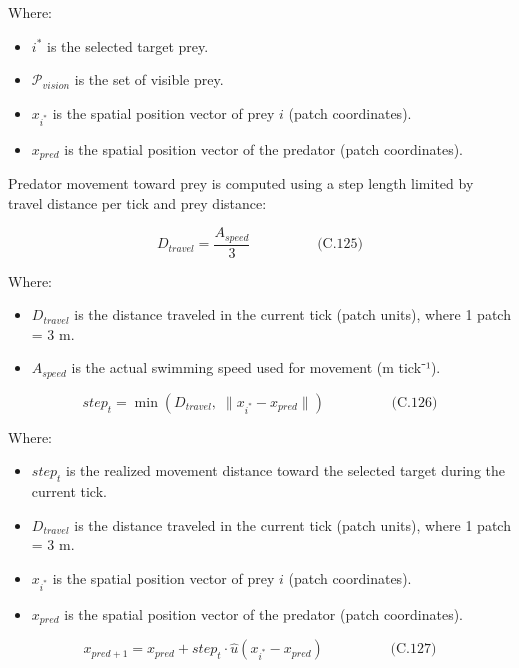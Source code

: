 \documentclass[
]{book}
\providecommand{\tightlist}{%
  \setlength{\itemsep}{0pt}\setlength{\parskip}{0pt}}
\begin{document}
Where:

\begin{itemize}
\tightlist
\item
  \(i^*\) is the selected target prey.
\item
  \(\mathcal{P}_{vision}\) is the set of visible prey.
\item
  \(x_{i^*}\) is the spatial position vector of prey \(i\) (patch
  coordinates).
\item
  \(x_{pred}\) is the spatial position vector of the predator (patch
  coordinates).
\end{itemize}

Predator movement toward prey is computed using a step length limited by
travel distance per tick and prey distance:

\[
\begin{equation} D_{travel} = \frac{A_{speed}}{3}  \hspace{2cm} \text{(C.125)} \end{equation}
\]

Where:

\begin{itemize}
\tightlist
\item
  \(D_{travel}\) is the distance traveled in the current tick (patch
  units), where 1 patch = 3 m.
\item
  \(A_{speed}\) is the actual swimming speed used for movement (m
  tick⁻¹).
\end{itemize}

\[
\begin{equation} step_t = \min(D_{travel},\; \|x_{i^*} - x_{pred}\|)  \hspace{2cm} \text{(C.126)} \end{equation}
\]

Where:

\begin{itemize}
\tightlist
\item
  \(step_{t}\) is the realized movement distance toward the selected
  target during the current tick.
\item
  \(D_{travel}\) is the distance traveled in the current tick (patch
  units), where 1 patch = 3 m.
\item
  \(x_{i^*}\) is the spatial position vector of prey \(i\) (patch
  coordinates).
\item
  \(x_{pred}\) is the spatial position vector of the predator (patch
  coordinates).
\end{itemize}

\[
\begin{equation} x_{pred+1} = x_{pred} + step_t \cdot \hat{u}(x_{i^*} - x_{pred})  \hspace{2cm} \text{(C.127)} \end{equation}
\]
\end{document}
